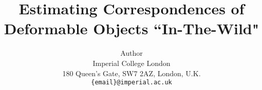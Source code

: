 \title{Estimating Correspondences of Deformable Objects ``In-The-Wild"}

\author{Author\\
Imperial College London\\
180 Queen’s Gate, SW7 2AZ, London, U.K.\\
{\tt\small \{email\}@imperial.ac.uk}}

